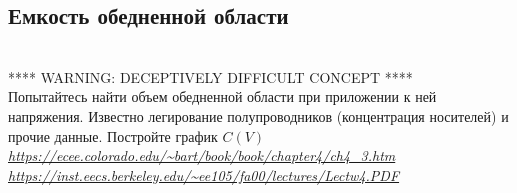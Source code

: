 \documentclass[a4paper,12pt]{article} %
\begin{document}
  \subsection{Емкость обедненной области}\\
  **** WARNING:  DECEPTIVELY DIFFICULT CONCEPT ****\\

  Попытайтесь найти объем обедненной области при приложении к ней напряжения. Известно легирование полупроводников (концентрация носителей) и прочие данные. Постройте график $C(V)$\\
  \textit{ \url{https://ecee.colorado.edu/~bart/book/book/chapter4/ch4_3.htm}}\\
  \textit{ \url{https://inst.eecs.berkeley.edu/~ee105/fa00/lectures/Lectw4.PDF}}



\end{document}
